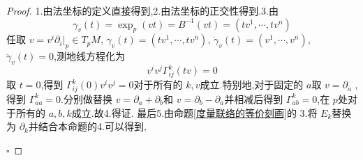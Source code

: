 \documentclass[../../几何与拓扑.tex]{subfiles}
\begin{document}
\begin{proof}
    1.由法坐标的定义直接得到,2.由法坐标的正交性得到.3.由 \[
     \gamma _{v}\left( t \right)= \exp _{p}\left( vt \right)= B^{-1} \left( vt \right)= \left( tv^{1},\cdots ,tv^{n} \right)    
    \]
    任取 \(  v = v^{i}\partial _{i}|_{p}\in T_{p}M  \), \(   \gamma _{v}\left( t \right)= \left( tv^{1},\cdots ,tv^{n} \right)    \), \(   \dot{\gamma}_{v} \left( t \right)= \left( v^{1},\cdots ,v^{n} \right)    \),    \(   \ddot{\gamma}_{v}\left( t \right)= 0   \),测地线方程化为 \[
    v^{i}v^{j} \Gamma _{ij}^{k}\left( tv \right) = 0
    \] 取 \(  t= 0  \),得到 \(   \Gamma _{ij}^{k}\left( 0 \right)v^{i}v^{j}= 0   \)对于所有的 \( k,v  \)成立.特别地,对于固定的 \(  a  \)取 \(  v = \partial _{a}  \)     ,得到 \(   \Gamma _{aa}^{k}= 0  \).分别做替换 \(  v = \partial _{a}+ \partial _{b}  \)和 \(  v =  \partial _{b}-\partial _{a}  \)并相减后得到 \(   \Gamma _{ab}^{k}= 0  \),在 \(  p  \)处对于所有的 \(  a,b,k  \)成立.故4.得证. 最后5.由命题\ref{度量联络的等价刻画}的 3.将 \(  E_{k}  \)替换为 \(  \partial _{k}  \)并结合本命题的4.可以得到,    

    \hfill $\square$
\end{proof}
\end{document}
